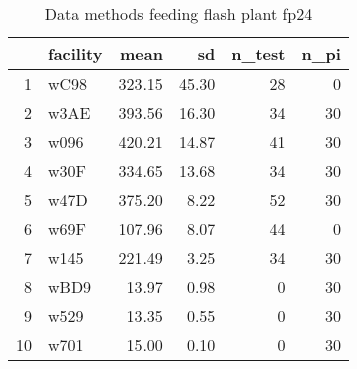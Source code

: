 \begin{table}[H]
\centering
\begin{tabular}{rlrrrr}
  \hline
 & facility & mean & sd & n\_test & n\_pi \\ 
  \hline
1 & wC98 & 323.15 & 45.30 &  28 &   0 \\ 
  2 & w3AE & 393.56 & 16.30 &  34 &  30 \\ 
  3 & w096 & 420.21 & 14.87 &  41 &  30 \\ 
  4 & w30F & 334.65 & 13.68 &  34 &  30 \\ 
  5 & w47D & 375.20 & 8.22 &  52 &  30 \\ 
  6 & w69F & 107.96 & 8.07 &  44 &   0 \\ 
  7 & w145 & 221.49 & 3.25 &  34 &  30 \\ 
  8 & wBD9 & 13.97 & 0.98 &   0 &  30 \\ 
  9 & w529 & 13.35 & 0.55 &   0 &  30 \\ 
  10 & w701 & 15.00 & 0.10 &   0 &  30 \\ 
   \hline
\end{tabular}
\caption{Data methods feeding flash plant fp24} 
\label{tab:well_summaries_fp14}
\end{table}
